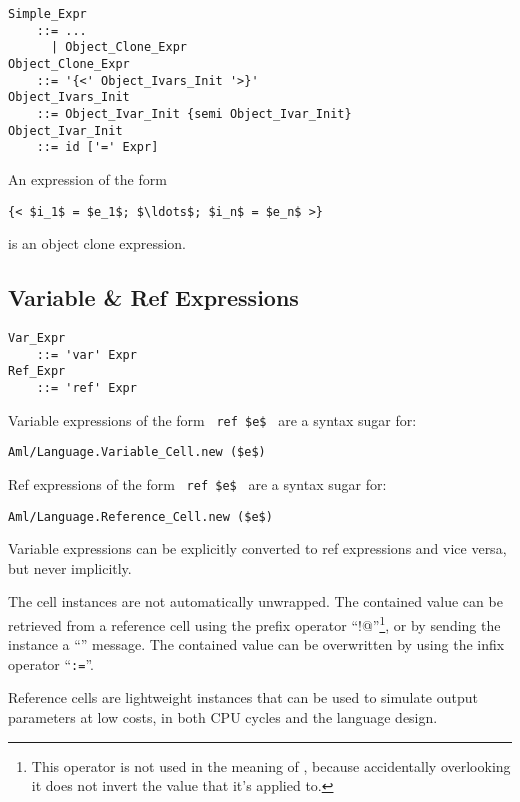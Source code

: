 \grammar\begin{lstlisting}
Simple_Expr 
    ::= ...
      | Object_Clone_Expr
Object_Clone_Expr 
    ::= '{<' Object_Ivars_Init '>}'
Object_Ivars_Init 
    ::= Object_Ivar_Init {semi Object_Ivar_Init}
Object_Ivar_Init
    ::= id ['=' Expr]
\end{lstlisting}

An expression of the form
\begin{lstlisting}
{< $i_1$ = $e_1$; $\ldots$; $i_n$ = $e_n$ >}
\end{lstlisting}
is an object clone expression. 





\subsection[Variable \& Ref Expressions]{Variable \& Ref Expressions}
\label{sec:ref-expressions}
\label{sec:var-expressions}

\grammar\begin{lstlisting}
Var_Expr
    ::= 'var' Expr
Ref_Expr 
    ::= 'ref' Expr
\end{lstlisting}

Variable expressions of the form ~\lstinline!ref $e$!~ are a syntax sugar for:
\begin{lstlisting}[deletekeywords={new}]
Aml/Language.Variable_Cell.new ($e$)
\end{lstlisting}

Ref expressions of the form ~\lstinline!ref $e$!~ are a syntax sugar for:
\begin{lstlisting}[deletekeywords={new}]
Aml/Language.Reference_Cell.new ($e$)
\end{lstlisting}

Variable expressions can be explicitly converted to ref expressions and vice versa, but never implicitly. 

The cell instances are not automatically unwrapped. The contained value can be retrieved from a reference cell using the prefix operator ``\lstinline@!@''\footnote{This operator is not used in the meaning of , because accidentally overlooking it does not invert the value that it's applied to.}, or by sending the instance a ``'' message. The contained value can be overwritten by using the infix operator ``\lstinline!:=!''.

Reference cells are lightweight instances that can be used to simulate output parameters at low costs, in both CPU cycles and the language design.

